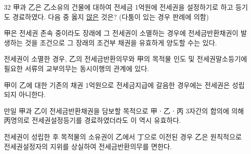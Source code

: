 \begin{question}{32}
甲과 乙은 乙소유의 건물에 대하여 전세금 1억원에 전세권을 설정하기로 하고 등기도 경료하였다. 다음 중 옳지 \uline{않은} 것은? (다툼이 있는 경우 판례에 의함)
\begin{choices}
  \item 甲은 전세권 존속 중이라도 장래에 그 전세권이 소멸하는 경우에 전세금반환채권이 발생하는 것을 조건으로 그 장래의 조건부 채권을 유효하게 양도할 수는 있다.
  \item 전세권이 소멸한 경우, 乙의 전세금반환의무와 甲의 목적물 인도 및 전세권말소등기에 필요한 서류의 교부의무는 동시이행의 관계에 있다.
  \item 甲이 乙에 대한 기존의 채권 1억원으로 전세금지급에 갈음한 경우에는 전세권은 성립되지 아니한다.
  \item 만일 甲과 乙이 전세금반환채권을 담보할 목적으로 甲ㆍ乙ㆍ丙 3자간의 합의에 의해 丙명의로 전세권설정등기를 경료하였더라도 이 역시 유효하다.
  \item 전세권이 성립한 후 목적물의 소유권이 乙에서 丁으로 이전된 경우 乙은 원칙적으로 전세권설정자의 지위를 상실하여 전세금반환의무를 면한다.
\end{choices}
\end{question}
